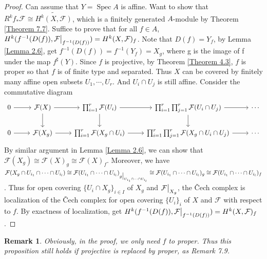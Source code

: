 \documentclass{ctexart}
\newtheorem{remark}{Remark}[section]
\newcommand{\spec}{\operatorname{Spec}}
\begin{document}
\begin{proof}
    Can assume that $Y = \spec A$ is affine.
    Want to show that $R^{k}f_{\ast}\mathcal{F} \cong \widetilde{H^{k}(X, \mathcal{F})}$,
    which is a finitely generated $A$-module by Theorem \ref{Theorem 7.7}.
    Suffice to prove that for all $f\in A$, $H^{k}(f^{-1}(D(f)), \mathcal{F}\big{|}_{f^{-1}(D(f))}) = H^{k}(X, \mathcal{F})_{f}$.
    Note that $D(f) = Y_{f}$, by Lemma \ref{Lemma 2.6}, get $f^{-1}(D(f)) = f^{-1}(Y_{f}) = X_{g}$, where g is the image of f under the map $f^{\sharp}(Y)$.
    Since $f$ is projective, by Theorem \ref{Theorem 4.3}, $f$ is proper so that $f$ is of finite type and separated.
    Thus $X$ can be covered by finitely many affine open subsets $U_{1}, \cdots, U_{r}$.
    And $U_{i} \cap U_{j}$ is still affine.
    Consider the commutative diagram
    \begin{equation*}
        \begin{tikzcd}
            0 \arrow[r] &
            \mathcal{F}(X) \arrow[r] \arrow[d] &
            \prod_{i = 1}^{r} \mathcal{F}(U_{i}) \arrow[r] \arrow[d] &
            \prod_{i = 1}^{r}\prod_{j = 1}^{r} \mathcal{F}(U_{i} \cap U_{j}) \arrow[r] \arrow[d] &
            \cdots \\
            0 \arrow[r] &
            \mathcal{F}(X_{g}) \arrow[r] &
            \prod_{i = 1}^{r} \mathcal{F}(X_{g} \cap U_{i}) \arrow[r] &
            \prod_{i = 1}^{r}\prod_{j = 1}^{r} \mathcal{F}(X_{g} \cap U_{i} \cap U_{j}) \arrow[r] &
            \cdots
        \end{tikzcd}
    \end{equation*}
    By similar argument in Lemma \ref{Lemma 2.6}, we can show that $\mathcal{F}(X_{g}) \cong \mathcal{F}(X)_{g} \cong \mathcal{F}(X)_{f}$.
    Moreover, we have $\mathcal{F}(X_{g} \cap U_{i_{1}} \cap \cdots \cap U_{i_{l}}) \cong \mathcal{F}(U_{i_{1}} \cap \cdots \cap U_{i_{l}})_{g\big{|}_{U_{i_{1}} \cap \cdots \cap U_{i_{l}}}} \cong \mathcal{F}(U_{i_{1}} \cap \cdots \cap U_{i_{l}})_{g} \cong \mathcal{F}(U_{i_{1}} \cap \cdots \cap U_{i_{l}})_{f}$.
    Thus for open covering $\{U_{i} \cap X_{g}\}_{i\in I}$ of $X_{g}$ and $\mathcal{F}\big{|}_{X_{g}}$,
    the Čech complex is localization of the Čech complex for open covering $\{U_{i}\}_{i}$ of $X$ and $\mathcal{F}$ with respect to $f$.
    By exactness of localization, get $H^{k}(f^{-1}(D(f)), \mathcal{F}\big{|}_{f^{-1}(D(f))}) = H^{k}(X, \mathcal{F})_{f}$.
\end{proof}
\begin{remark}
    Obviously, in the proof, we only need $f$ to proper.
    Thus this proposition still holds if projective is replaced by proper, as Remark 7.9.
\end{remark}
\end{document}
